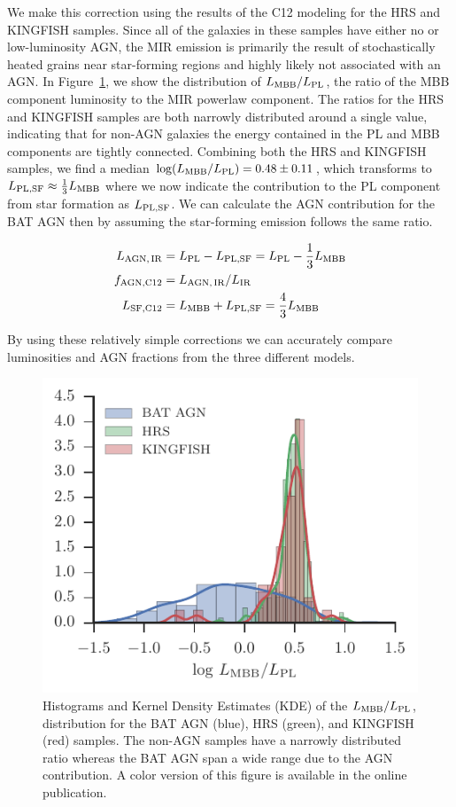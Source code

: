 \documentclass[fleqn,usenatbib]{mnras}
\begin{document}
We make this correction using the results of the C12 modeling for the HRS and KINGFISH samples. Since all of the galaxies in these samples have either no or low-luminosity AGN, the MIR emission is primarily the result of stochastically heated grains near star-forming regions and highly likely not associated with an AGN. In Figure~\ref{fig:lmbb_lpl_ratio}, we show the distribution of $L_{\rm MBB}/L_{\rm PL}$, the ratio of the MBB component luminosity to the MIR powerlaw component. The ratios for the HRS and KINGFISH samples are both narrowly distributed around a single value, indicating that for non-AGN galaxies the energy contained in the PL and MBB components are tightly connected. Combining both the HRS and KINGFISH samples, we find a median $\log(L_{\rm MBB}/L_{\rm PL})=0.48 \pm 0.11$, which transforms to $L_{\rm PL,SF} \approx \frac{1}{3}L_{\rm MBB}$ where we now indicate the contribution to the PL component from star formation as  $L_{\rm PL,SF}$. We can calculate the AGN contribution for the BAT AGN then by assuming the star-forming emission follows the same ratio.

\begin{align}\label{eq:c12_lum}
L_{\rm AGN,\,IR} &= L_{\rm PL} - L_{\rm PL, SF} = L_{\rm PL} - \frac{1}{3}L_{\rm MBB} \\
f_{\rm AGN, C12} &= L_{\rm AGN, \, IR}/L_{\rm IR} \\
L_{\rm SF, C12} &= L_{\rm MBB} + L_{\rm PL,SF} =  \frac{4}{3}L_{\rm MBB}
\end{align}

By using these relatively simple corrections we can accurately compare luminosities and AGN fractions from the three different models.
\begin{figure}\label{fig:lmbb_lpl_ratio}
\includegraphics[width=\columnwidth]{figures/lmbb-lpl-ratio}
\caption{Histograms and Kernel Density Estimates (KDE) of the $L_{\rm MBB}/L_{\rm PL}$, distribution for the BAT AGN (blue), HRS (green), and KINGFISH (red) samples. The non-AGN samples have a narrowly distributed ratio whereas the BAT AGN span a wide range due to the AGN contribution. A color version of this figure is available in the online publication.}
\end{figure}
\end{document}
